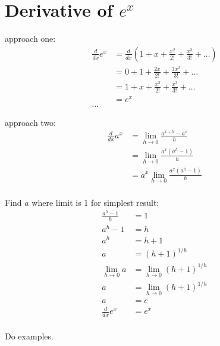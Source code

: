 \documentclass[letterpaper, portrait]{exam}
\begin{document}
  \section{Derivative of $e^x$} %

  approach one:
  \begin{align*}
    \frac{d}{dx} e^x &= \frac{d}{dx} \left( 1 + x + \frac{x^2}{2!} + \frac{x^3}{3!} + \ldots  \right) \\
                     &= 0 + 1 + \frac{2 x}{2!} + \frac{3x^2}{3!} + \ldots \\
                     &= 1 + x + \frac{x^2}{2!} + \frac{x^3}{3!} + \ldots \\
                     &= e^x \\
    \ldots
  \end{align*}

  approach two:
  \begin{align*}
    \frac{d}{dx} a^x & = \lim_{h \to 0} \frac{a^{x + h} - a^x}{h} \\
                     & = \lim_{h \to 0} \frac{a^x \left( a^h - 1 \right)}{h} \\
                     & = a^x \lim_{h \to 0} \frac{a^x \left( a^h - 1 \right)}{h} \\
  \end{align*}

  Find $a$ where limit is 1 for simplest result:
  \begin{align*}
    \frac{a^h - 1}{h} & = 1 \\
    a^h - 1           & = h \\
    a^h               & = h + 1 \\
    a                 & = \left( h + 1 \right)^{1/h} \\
    \lim_{h \to 0} a  & = \lim_{h \to 0} \left( h + 1 \right)^{1/h} \\
    a                 & = \lim_{h \to 0} \left( h + 1 \right)^{1/h} \\
    a                 & = e \\
    \frac{d}{dx} e^x  & = e^x \\
  \end{align*}

  Do examples.
\end{document}

